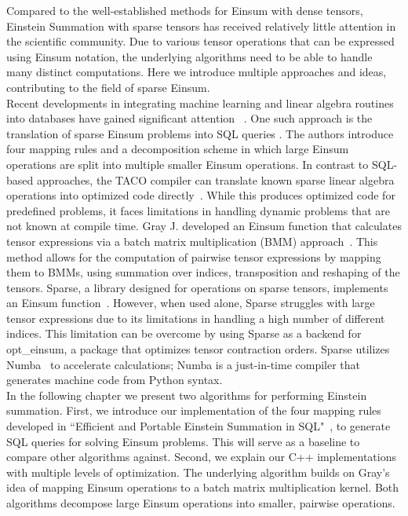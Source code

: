 \noindent
Compared to the well-established methods for Einsum with dense tensors, Einstein Summation with
sparse tensors has received relatively little attention in the scientific community.
Due to various tensor operations that can be expressed using Einsum notation, the
underlying algorithms need to be able to handle many distinct computations. Here we
introduce multiple approaches and ideas, contributing to the field of sparse Einsum.\\
Recent developments in integrating machine learning and linear algebra routines into
databases have gained significant attention
~\cite{Machine_Learning_LinA_and_More, du2020inmachinelearningdatabasereimaginingdeep,
    deepdive, data_management_in_machine_learning}.
One such approach is the translation of sparse Einsum problems into SQL queries
\cite{sql_einsum}. The authors introduce four mapping rules and a decomposition scheme
in which large Einsum operations are split into multiple smaller Einsum operations.
In contrast to SQL-based approaches, the TACO compiler can translate known sparse linear
algebra operations into optimized code directly~\cite{taco}. While this produces
optimized code for predefined problems, it faces limitations in handling dynamic problems
that are not known at compile time.
Gray J. developed an Einsum function that calculates tensor expressions via a batch matrix
multiplication (BMM) approach~\cite{jcmgray}. This method allows for the computation of pairwise
tensor expressions by mapping them to BMMs, using summation over indices, transposition
and reshaping of the tensors. Sparse, a library designed for operations on sparse tensors,
implements an Einsum function~\cite{sparse}. However, when used alone, Sparse struggles with
large tensor expressions due to its limitations in handling a high number of different indices.
This limitation can be overcome by using Sparse as a backend for opt\_einsum, a package that
optimizes tensor contraction orders. Sparse utilizes Numba~\cite{lam2015numba} to accelerate
calculations; Numba is a just-in-time compiler that generates machine code from Python syntax.\\
In the following chapter we present two algorithms for performing Einstein summation. First,
we introduce our implementation of the four mapping rules developed in ``Efficient and Portable
Einstein Summation in SQL"~\cite{sql_einsum}, to generate SQL queries for solving Einsum problems.
This will serve as a baseline to compare other algorithms against. Second, we explain our C++
implementations with multiple levels of optimization. The underlying algorithm builds on Gray's
idea of mapping Einsum operations to a batch matrix multiplication kernel. Both algorithms decompose
large Einsum operations into smaller, pairwise operations.
